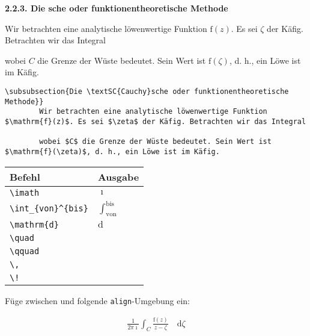 \begin{frame}[fragile]
	\Losung
	\begin{outputbox}
		{ \large\textbf{2.2.3. Die  sche oder funktionentheoretische Methode}}
		
		Wir betrachten eine analytische löwenwertige Funktion $\mathrm{f}(z)$. Es sei $\zeta$ der Käfig. Betrachten wir das Integral
		
	    wobei $C$ die Grenze der Wüste bedeutet. Sein Wert ist $\mathrm{f}(\zeta)$, d. h., ein Löwe ist im Käfig.
    \end{outputbox}

	\Code
	\begin{lstlisting}[gobble=4]
    \subsubsection{Die \textSC{Cauchy}sche oder funktionentheoretische Methode}}
		Wir betrachten eine analytische löwenwertige Funktion $\mathrm{f}(z)$. Es sei $\zeta$ der Käfig. Betrachten wir das Integral
		
		wobei $C$ die Grenze der Wüste bedeutet. Sein Wert ist $\mathrm{f}(\zeta)$, d. h., ein Löwe ist im Käfig.
	\end{lstlisting}
\end{frame}
\begin{frame}[fragile]
	\begin{center}
		\begin{tabular}{ll}
			\toprule
			Befehl							&	Ausgabe					\\ \midrule
			\lstinline|\imath|				&	$\imath$					\\
			\lstinline|\int_{von}^{bis}|		&	$\int_{\mathrm{von}}^{\mathrm{bis}}$		\\ \addlinespace[0.5em]
			\lstinline|\mathrm{d}|		&	$\mathrm{d}$		
		    \\ 			
		    \lstinline|\quad|		&	$\quad$		
	        \\ 
			\lstinline|\qquad|		&	$\qquad$		
			\\
			\lstinline|\,|					&	$\,$		\\
			\lstinline|\!|					&	$\!$		\\
			\bottomrule
		\end{tabular}
	\end{center}
	\pause\btVFill
	\Aufgabee
		Füge zwischen  und  folgende \lstinline[basicstyle=\normalfont\normalsize]|align|-Umgebung ein:
	\begin{outputbox}
	    \begin{align}
		    \frac{1}{2 \pi \imath} \int_C \frac{\mathrm{f}(z)}{z - \zeta} \quad \! \! \mathrm{d} \zeta
	    \end{align}	
	\end{outputbox}
	\vspace{0.2cm}
\end{frame}
